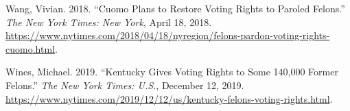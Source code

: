 \documentclass[
  12pt,
]{article}
\newlength{\cslhangindent}
\newenvironment{cslreferences}%
  {\setlength{\parindent}{0pt}%
  \everypar{\setlength{\hangindent}{\cslhangindent}}\ignorespaces}%
  {\par}
\begin{document}
\begin{cslreferences}
\leavevmode\hypertarget{ref-Wang2018}{}%
Wang, Vivian. 2018. ``Cuomo Plans to Restore Voting Rights to Paroled Felons.'' \emph{The New York Times: New York}, April 18, 2018. \url{https://www.nytimes.com/2018/04/18/nyregion/felons-pardon-voting-rights-cuomo.html}.

\leavevmode\hypertarget{ref-Wines2019}{}%
Wines, Michael. 2019. ``Kentucky Gives Voting Rights to Some 140,000 Former Felons.'' \emph{The New York Times: U.S.}, December 12, 2019. \url{https://www.nytimes.com/2019/12/12/us/kentucky-felons-voting-rights.html}.
\end{cslreferences}
\end{document}
